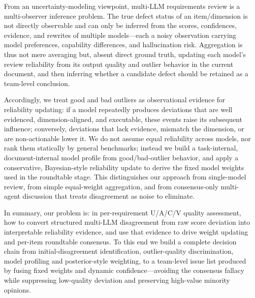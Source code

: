 \documentclass[sn-mathphys-num]{sn-jnl}
\begin{document}
From an uncertainty-modeling viewpoint, multi-LLM requirements review is a multi-observer inference problem. The true defect status of an item/dimension is not directly observable and can only be inferred from the scores, confidences, evidence, and rewrites of multiple models---each a noisy observation carrying model preferences, capability differences, and hallucination risk. Aggregation is thus not mere averaging but, absent direct ground truth, updating each model's review reliability from its output quality and outlier behavior in the current document, and then inferring whether a candidate defect should be retained as a team-level conclusion.

Accordingly, we treat good and bad outliers as observational evidence for reliability updating: if a model repeatedly produces deviations that are well evidenced, dimension-aligned, and executable, these events raise its subsequent influence; conversely, deviations that lack evidence, mismatch the dimension, or are non-actionable lower it. We do not assume equal reliability across models, nor rank them statically by general benchmarks; instead we build a task-internal, document-internal model profile from good/bad-outlier behavior, and apply a conservative, Bayesian-style reliability update to derive the fixed model weights used in the roundtable stage. This distinguishes our approach from single-model review, from simple equal-weight aggregation, and from consensus-only multi-agent discussion that treats disagreement as noise to eliminate.

In summary, our problem is: in per-requirement U/A/C/V quality assessment, how to convert structured multi-LLM disagreement from raw score deviation into interpretable reliability evidence, and use that evidence to drive weight updating and per-item roundtable consensus. To this end we build a complete decision chain from initial-disagreement identification, outlier-quality discrimination, model profiling and posterior-style weighting, to a team-level issue list produced by fusing fixed weights and dynamic confidence---avoiding the consensus fallacy while suppressing low-quality deviation and preserving high-value minority opinions.
\end{document}
